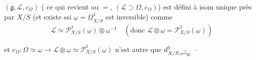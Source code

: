 $(\mathfrak g,\mathscr L,c_\Omega)$ ( ce qui revient au $=$, $(\mathscr L\supset\Omega,c_\Omega)$) est défini à isom unique près par $X/S$ (et existe ssi $\underline\omega=\underline\Omega^1_{X/S}$ est inversible) comme
\[ \mathscr L\simeq\mathcal P^1_{X/S}(\underline\omega)\otimes\underline\omega^{-1}\quad(\text{donc }\mathscr L\otimes\underline\omega=\mathcal P^1_{X/S}(\underline\omega)) \]

et $c_\Omega:\Omega\simeq\underline\omega\longrightarrow\mathscr L\otimes\underline\omega\simeq\mathcal P^1_{X/S}(\underline\omega)$ n'est autre que $d^1_{X/S,\deleted{\unsure{\omega}}\underline\omega}$ --

